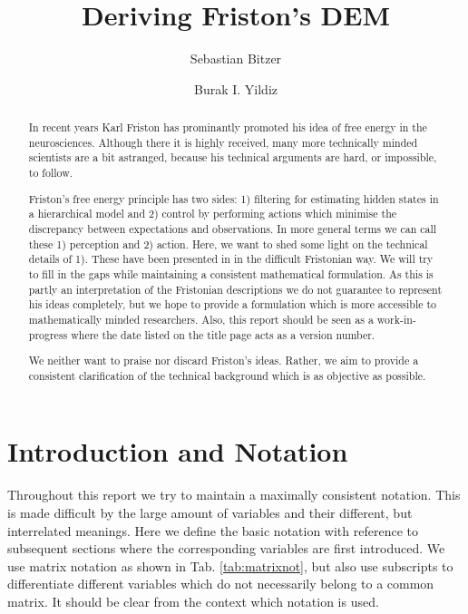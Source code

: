 \documentclass[a4paper,10pt]{article}
\title{Deriving Friston's DEM}
\author{Sebastian Bitzer \and Burak I. Yildiz}
\begin{document}
\maketitle

\begin{abstract}
In recent years Karl Friston has prominantly promoted his idea of free energy in the neurosciences. Although there it is highly received, many more technically minded scientists are a bit astranged, because his technical arguments are hard, or impossible, to follow.

Friston's free energy principle has two sides: 1) filtering for estimating hidden states in a hierarchical model and 2) control by performing actions which minimise the discrepancy between expectations and observations. In more general terms we can call these 1) perception and 2) action. Here, we want to shed some light on the technical details of 1). These have been presented in \cite{Friston2008a,Friston2008} in the difficult Fristonian way. We will try to fill in the gaps while maintaining a consistent mathematical formulation. As this is partly an interpretation of the Fristonian descriptions we do not guarantee to represent his ideas completely, but we hope to provide a formulation which is more accessible to mathematically minded researchers. Also, this report should be seen as a work-in-progress where the date listed on the title page acts as a version number.

We neither want to praise nor discard Friston's ideas. Rather, we aim to provide a consistent clarification of the technical background which is as objective as possible.
\end{abstract}

\newpage
\tableofcontents
\newpage

\section{Introduction and Notation}
Throughout this report we try to maintain a maximally consistent notation. This is made difficult by the large amount of variables and their different, but interrelated meanings. Here we define the basic notation with reference to subsequent sections where the corresponding variables are first introduced. We use matrix notation as shown in Tab. \ref{tab:matrixnot}, but also use subscripts to differentiate different variables which do not necessarily belong to a common matrix. It should be clear from the context which notation is used. 
\end{document}
